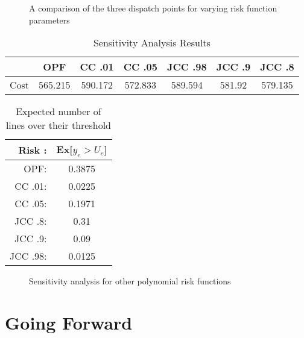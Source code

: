 \begin{figure}
\centering

\caption{A comparison of the three dispatch points for varying risk function parameters}\label{figsense}
\end{figure}


\begin{table}
\centering
 \begin{tabular}{ |c| c c c c c c|}
\hline
& OPF & CC .01 & CC .05 & JCC .98 & JCC .9 & JCC .8 \\
\hline
\hline
Cost & 565.215 & 590.172 & 572.833& 589.594 & 581.92 &579.135\\
\hline
\end{tabular}
\caption{Sensitivity Analysis Results}
\end{table}


\begin{table}
\centering
\begin{tabular}{| r  c |}
\hline
Risk :& Ex[$y_e > U_e$] \\
\hline
\hline
OPF:& 0.3875\\
CC .01:& 0.0225\\
CC .05:& 0.1971 \\
JCC .8:& 0.31 \\
JCC .9:& 0.09 \\
JCC .98:& 0.0125 \\
\hline
\end{tabular}
\caption{Expected number of lines over their threshold}
\end{table}

\begin{figure}

\caption{Sensitivity analysis for other polynomial risk functions}
\end{figure}


\section{Going Forward}

